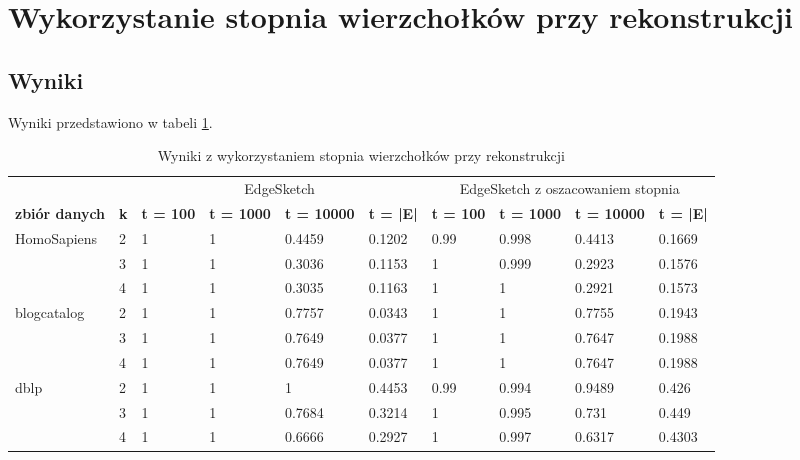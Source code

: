 \section{Wykorzystanie stopnia wierzchołków przy rekonstrukcji}

    \subsection{Wyniki}

    Wyniki przedstawiono w tabeli \ref{tab:degree}.

    \begin{table}[!ht]
        \small
        \centering
        \begin{tabular}{|l|l|l|l|l|l|l|l|l|l|}
        \hline
        & & \multicolumn{4}{c|}{EdgeSketch} & \multicolumn{4}{c|}{EdgeSketch z oszacowaniem stopnia} \\ \cline{1-10}
            \textbf{zbiór danych} & \textbf{k} & \textbf{t = 100} & \textbf{t = 1000} & \textbf{t = 10000} & \textbf{t = |E|} & \textbf{t = 100} & \textbf{t = 1000} & \textbf{t = 10000} & \textbf{t = |E|} \\ \hline\hline
            \multirow{3}{*}{HomoSapiens} & 2 & 1 & 1 & 0.4459 & 0.1202 & 0.99 & 0.998 & 0.4413 & 0.1669 \\ \cline{2-10}
            & 3 & 1 & 1 & 0.3036 & 0.1153 & 1 & 0.999 & 0.2923 & 0.1576 \\ \cline{2-10}
            & 4 & 1 & 1 & 0.3035 & 0.1163 & 1 & 1 & 0.2921 & 0.1573 \\ \hline\hline
            \multirow{3}{*}{blogcatalog} & 2 & 1 & 1 & 0.7757 & 0.0343 & 1 & 1 & 0.7755 & 0.1943 \\ \cline{2-10}
            & 3 & 1 & 1 & 0.7649 & 0.0377 & 1 & 1 & 0.7647 & 0.1988 \\ \cline{2-10}
            & 4 & 1 & 1 & 0.7649 & 0.0377 & 1 & 1 & 0.7647 & 0.1988 \\ \hline\hline
            \multirow{3}{*}{dblp} & 2 & 1 & 1 & 1 & 0.4453 & 0.99 & 0.994 & 0.9489 & 0.426 \\ \cline{2-10}
            & 3 & 1 & 1 & 0.7684 & 0.3214 & 1 & 0.995 & 0.731 & 0.449 \\ \cline{2-10}
            & 4 & 1 & 1 & 0.6666 & 0.2927 & 1 & 0.997 & 0.6317 & 0.4303 \\ \hline
        \end{tabular}
        \label{tab:degree}
        \caption{Wyniki z wykorzystaniem stopnia wierzchołków przy rekonstrukcji}
    \end{table}

